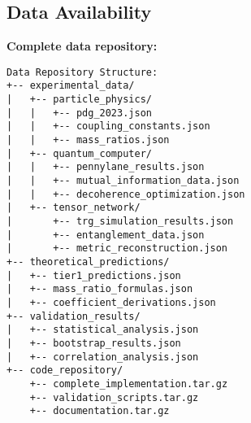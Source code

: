\documentclass[11pt]{article}
\theoremstyle{definition}
\begin{document}
\subsection{Data Availability}

\textbf{Complete data repository:}

\begin{verbatim}
Data Repository Structure:
+-- experimental_data/
|   +-- particle_physics/
|   |   +-- pdg_2023.json
|   |   +-- coupling_constants.json
|   |   +-- mass_ratios.json
|   +-- quantum_computer/
|   |   +-- pennylane_results.json
|   |   +-- mutual_information_data.json
|   |   +-- decoherence_optimization.json
|   +-- tensor_network/
|       +-- trg_simulation_results.json
|       +-- entanglement_data.json
|       +-- metric_reconstruction.json
+-- theoretical_predictions/
|   +-- tier1_predictions.json
|   +-- mass_ratio_formulas.json
|   +-- coefficient_derivations.json
+-- validation_results/
|   +-- statistical_analysis.json
|   +-- bootstrap_results.json
|   +-- correlation_analysis.json
+-- code_repository/
    +-- complete_implementation.tar.gz
    +-- validation_scripts.tar.gz
    +-- documentation.tar.gz
\end{verbatim}

% 
% 
\end{document}
